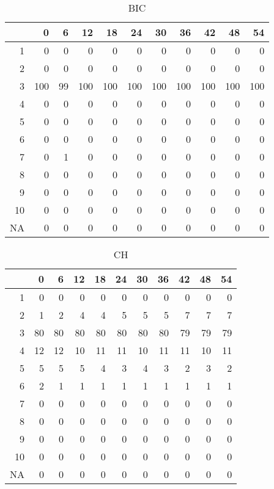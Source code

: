 \documentclass[11pt]{article}
\begin{document}
\begin{table}[H]
\centering
\begin{tabular}{rrrrrrrrrrr}
  \hline
 & 0 & 6 & 12 & 18 & 24 & 30 & 36 & 42 & 48 & 54 \\ 
  \hline
1 & 0 & 0 & 0 & 0 & 0 & 0 & 0 & 0 & 0 & 0 \\ 
  2 & 0 & 0 & 0 & 0 & 0 & 0 & 0 & 0 & 0 & 0 \\ 
  3 & 100 & 99 & 100 & 100 & 100 & 100 & 100 & 100 & 100 & 100 \\ 
  4 & 0 & 0 & 0 & 0 & 0 & 0 & 0 & 0 & 0 & 0 \\ 
  5 & 0 & 0 & 0 & 0 & 0 & 0 & 0 & 0 & 0 & 0 \\ 
  6 & 0 & 0 & 0 & 0 & 0 & 0 & 0 & 0 & 0 & 0 \\ 
  7 & 0 & 1 & 0 & 0 & 0 & 0 & 0 & 0 & 0 & 0 \\ 
  8 & 0 & 0 & 0 & 0 & 0 & 0 & 0 & 0 & 0 & 0 \\ 
  9 & 0 & 0 & 0 & 0 & 0 & 0 & 0 & 0 & 0 & 0 \\ 
  10 & 0 & 0 & 0 & 0 & 0 & 0 & 0 & 0 & 0 & 0 \\ 
  NA & 0 & 0 & 0 & 0 & 0 & 0 & 0 & 0 & 0 & 0 \\ 
   \hline
\end{tabular}
\caption{BIC} 
\end{table}
\begin{table}[H]
\centering
\begin{tabular}{rrrrrrrrrrr}
  \hline
 & 0 & 6 & 12 & 18 & 24 & 30 & 36 & 42 & 48 & 54 \\ 
  \hline
1 & 0 & 0 & 0 & 0 & 0 & 0 & 0 & 0 & 0 & 0 \\ 
  2 & 1 & 2 & 4 & 4 & 5 & 5 & 5 & 7 & 7 & 7 \\ 
  3 & 80 & 80 & 80 & 80 & 80 & 80 & 80 & 79 & 79 & 79 \\ 
  4 & 12 & 12 & 10 & 11 & 11 & 10 & 11 & 11 & 10 & 11 \\ 
  5 & 5 & 5 & 5 & 4 & 3 & 4 & 3 & 2 & 3 & 2 \\ 
  6 & 2 & 1 & 1 & 1 & 1 & 1 & 1 & 1 & 1 & 1 \\ 
  7 & 0 & 0 & 0 & 0 & 0 & 0 & 0 & 0 & 0 & 0 \\ 
  8 & 0 & 0 & 0 & 0 & 0 & 0 & 0 & 0 & 0 & 0 \\ 
  9 & 0 & 0 & 0 & 0 & 0 & 0 & 0 & 0 & 0 & 0 \\ 
  10 & 0 & 0 & 0 & 0 & 0 & 0 & 0 & 0 & 0 & 0 \\ 
  NA & 0 & 0 & 0 & 0 & 0 & 0 & 0 & 0 & 0 & 0 \\ 
   \hline
\end{tabular}
\caption{CH} 
\end{table}
\end{document}
